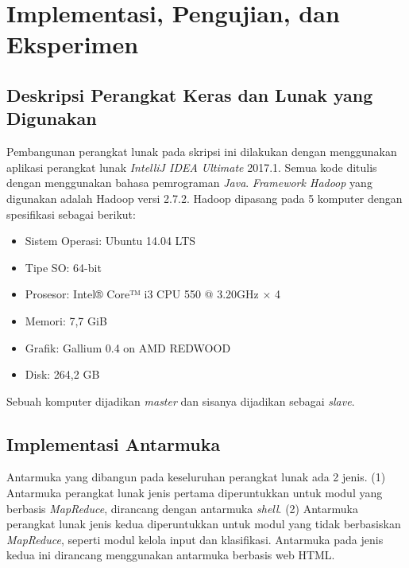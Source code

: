 \chapter{Implementasi, Pengujian, dan Eksperimen}

\section{Deskripsi Perangkat Keras dan Lunak yang Digunakan}
\label{sec:desc_perangkat}
Pembangunan perangkat lunak pada skripsi ini dilakukan dengan menggunakan aplikasi perangkat lunak \textit{IntelliJ IDEA Ultimate} 2017.1. Semua kode ditulis dengan menggunakan bahasa pemrograman \textit{Java}. \textit{Framework Hadoop} yang digunakan adalah Hadoop versi 2.7.2. Hadoop dipasang pada 5 komputer dengan spesifikasi sebagai berikut:
\begin{itemize}
	\item Sistem Operasi: Ubuntu 14.04 LTS
	\item Tipe SO: 64-bit
	\item Prosesor: Intel® Core™ i3 CPU 550 @ 3.20GHz × 4 
	\item Memori: 7,7 GiB
	\item Grafik: Gallium 0.4 on AMD REDWOOD
	\item Disk: 264,2 GB
\end{itemize}
Sebuah komputer dijadikan \textit{master} dan sisanya dijadikan sebagai \textit{slave}.

\section{Implementasi Antarmuka}
\label{sec:impl_antarmuka}

Antarmuka yang dibangun pada keseluruhan perangkat lunak ada 2 jenis. (1) Antarmuka perangkat lunak jenis pertama diperuntukkan untuk modul yang berbasis \textit{MapReduce}, dirancang dengan antarmuka \textit{shell}. (2) Antarmuka perangkat lunak jenis kedua diperuntukkan untuk modul yang tidak berbasiskan \textit{MapReduce}, seperti modul kelola input dan klasifikasi. Antarmuka pada jenis kedua ini dirancang menggunakan antarmuka berbasis web HTML.

